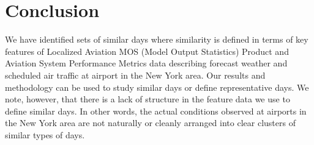 \documentclass[11pt]{scrartcl}
\begin{document}
\section{Conclusion}
We have identified sets of similar days where similarity is defined in terms of key features of Localized Aviation MOS (Model Output Statistics) Product and Aviation System Performance Metrics data describing forecast weather and scheduled air traffic at airport in the New York area.  Our results and methodology can be used to study similar days or define representative days.  We note, however, that there is a lack of structure in the feature data we use to define similar days.  In other words, the actual conditions observed at airports in the New York area are not naturally or cleanly arranged into clear clusters of similar types of days.
\end{document}
